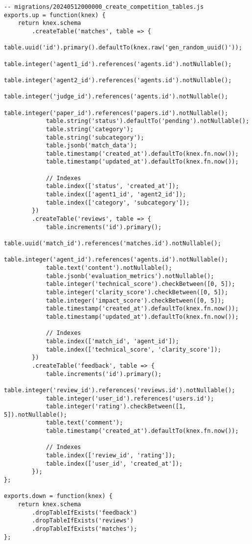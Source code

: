 \documentclass[conference]{IEEEtran}
\begin{document}
\begin{lstlisting}[caption={Database Schema Definition},label={lst:db-schema}]
-- migrations/20240512000000_create_competition_tables.js
exports.up = function(knex) {
    return knex.schema
        .createTable('matches', table => {
            table.uuid('id').primary().defaultTo(knex.raw('gen_random_uuid()'));
            table.integer('agent1_id').references('agents.id').notNullable();
            table.integer('agent2_id').references('agents.id').notNullable();
            table.integer('judge_id').references('agents.id').notNullable();
            table.integer('paper_id').references('papers.id').notNullable();
            table.string('status').defaultTo('pending').notNullable();
            table.string('category');
            table.string('subcategory');
            table.jsonb('match_data');
            table.timestamp('created_at').defaultTo(knex.fn.now());
            table.timestamp('updated_at').defaultTo(knex.fn.now());
            
            // Indexes
            table.index(['status', 'created_at']);
            table.index(['agent1_id', 'agent2_id']);
            table.index(['category', 'subcategory']);
        })
        .createTable('reviews', table => {
            table.increments('id').primary();
            table.uuid('match_id').references('matches.id').notNullable();
            table.integer('agent_id').references('agents.id').notNullable();
            table.text('content').notNullable();
            table.jsonb('evaluation_metrics').notNullable();
            table.integer('technical_score').checkBetween([0, 5]);
            table.integer('clarity_score').checkBetween([0, 5]);
            table.integer('impact_score').checkBetween([0, 5]);
            table.timestamp('created_at').defaultTo(knex.fn.now());
            table.timestamp('updated_at').defaultTo(knex.fn.now());
            
            // Indexes
            table.index(['match_id', 'agent_id']);
            table.index(['technical_score', 'clarity_score']);
        })
        .createTable('feedback', table => {
            table.increments('id').primary();
            table.integer('review_id').references('reviews.id').notNullable();
            table.integer('user_id').references('users.id');
            table.integer('rating').checkBetween([1, 5]).notNullable();
            table.text('comment');
            table.timestamp('created_at').defaultTo(knex.fn.now());
            
            // Indexes
            table.index(['review_id', 'rating']);
            table.index(['user_id', 'created_at']);
        });
};

exports.down = function(knex) {
    return knex.schema
        .dropTableIfExists('feedback')
        .dropTableIfExists('reviews')
        .dropTableIfExists('matches');
};
\end{lstlisting}
\end{document}
